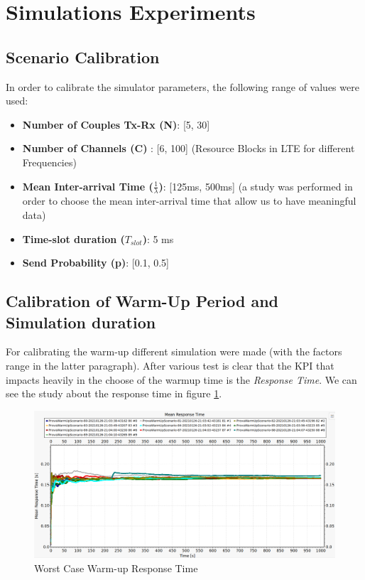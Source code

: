 \section{Simulations Experiments}
\subsection{Scenario Calibration}
In order to calibrate the simulator parameters, the following range of values were used:
\begin{itemize}
	\item \textbf{Number of Couples Tx-Rx (N)}: [5, 30]
	\item \textbf{Number of Channels (C)} : [6, 100] (Resource Blocks in LTE for different Frequencies)
	\item \textbf{Mean Inter-arrival Time ($\frac{1}{\lambda}$)}: [125ms, 500ms] (a study was performed in order to choose the mean inter-arrival time that allow us to have meaningful data)   
	\item \textbf{Time-slot duration ($T_{slot}$)}: 5 ms
	\item \textbf{Send Probability (p)}: [0.1, 0.5] 
\end{itemize}

\subsection{Calibration of Warm-Up Period and Simulation duration}
For calibrating the warm-up different simulation were made (with the factors range in the latter paragraph). After various test is clear that the KPI that impacts heavily in the choose of the warmup time is the \textit{Response Time}. We can see the study about the response time in figure \ref{img: warmUp}.
\begin{figure}[H]
	\centering
	\includegraphics[width=\textwidth]{img/warmup.png}
	\caption{Worst Case Warm-up Response Time}
	\label {img: warmUp}
\end{figure}  

